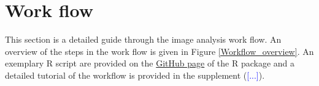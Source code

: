 \documentclass{report}
\begin{document}
\section{Work flow}

This section is a detailed guide through the image analysis work flow. An overview of the steps in the work flow is given in Figure \ref{Workflow_overview}. An exemplary R script are provided on the \href{https://github.com/juliaquach02/cellcontacts}{GitHub page} of the R package and a detailed tutorial of the workflow is provided in the supplement (\textcolor{blue}{[...]}).

\end{document}
